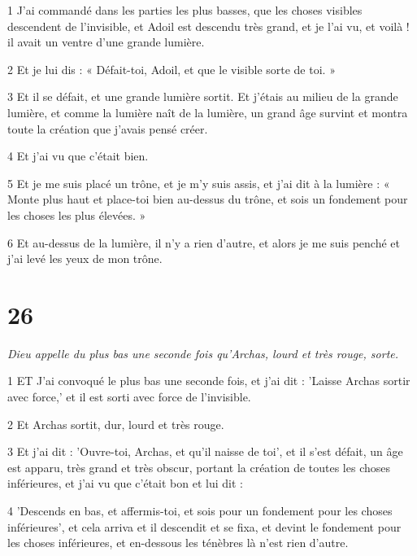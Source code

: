 \par 1 J'ai commandé dans les parties les plus basses, que les choses visibles descendent de l'invisible, et Adoil est descendu très grand, et je l'ai vu, et voilà ! il avait un ventre d'une grande lumière.

\par 2 Et je lui dis : « Défait-toi, Adoil, et que le visible sorte de toi. »

\par 3 Et il se défait, et une grande lumière sortit. Et j'étais au milieu de la grande lumière, et comme la lumière naît de la lumière, un grand âge survint et montra toute la création que j'avais pensé créer.

\par 4 Et j'ai vu que c'était bien.

\par 5 Et je me suis placé un trône, et je m'y suis assis, et j'ai dit à la lumière : « Monte plus haut et place-toi bien au-dessus du trône, et sois un fondement pour les choses les plus élevées. »

\par 6 Et au-dessus de la lumière, il n'y a rien d'autre, et alors je me suis penché et j'ai levé les yeux de mon trône.

\chapter{26}

\par \textit{Dieu appelle du plus bas une seconde fois qu'Archas, lourd et très rouge, sorte.}

\par 1 ET J'ai convoqué le plus bas une seconde fois, et j'ai dit : 'Laisse Archas sortir avec force,' et il est sorti avec force de l'invisible.

\par 2 Et Archas sortit, dur, lourd et très rouge.

\par 3 Et j'ai dit : 'Ouvre-toi, Archas, et qu'il naisse de toi', et il s'est défait, un âge est apparu, très grand et très obscur, portant la création de toutes les choses inférieures, et j'ai vu que c'était bon et lui dit :

\par 4 'Descends en bas, et affermis-toi, et sois pour un fondement pour les choses inférieures', et cela arriva et il descendit et se fixa, et devint le fondement pour les choses inférieures, et en-dessous les ténèbres là n'est rien d'autre.



